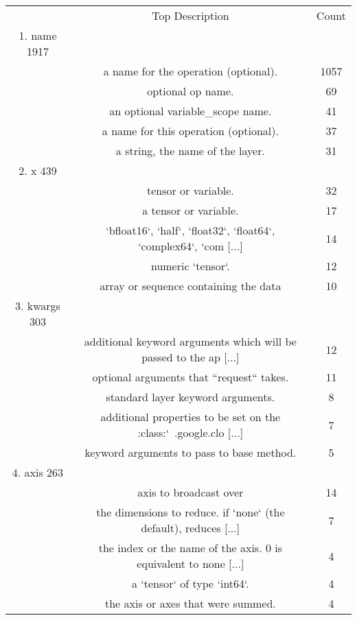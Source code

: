 \begin{table}[h]
    \begin{center}
    \begin{tabular}{c | c | c }       
 & Top Description & Count\\
1. name   1917 \\
\hline
&  a name for the operation (optional).                                & 1057 \\
&  optional op name.                                                   & 69 \\
&  an optional variable\_scope name.                                    & 41 \\
&  a name for this operation (optional).                               & 37 \\
&  a string, the name of the layer.                                    & 31 \\

2. x       439 \\
\hline
&  tensor or variable.                                                 & 32 \\
&  a tensor or variable.                                               & 17 \\
&  `bfloat16`, `half`, `float32`, `float64`, `complex64`, `com [...]   & 14 \\
&  numeric `tensor`.                                                   & 12 \\
&  array or sequence containing the data                               & 10 \\

3. kwargs  303 \\
\hline
&  additional keyword arguments which will be passed to the ap [...]   & 12 \\
&  optional arguments that ``request`` takes.                          & 11 \\
&  standard layer keyword arguments.                                   & 8 \\
&  additional properties to be set on the :class:`~.google.clo [...]   & 7 \\
&  keyword arguments to pass to base method.                           & 5 \\

4. axis    263 \\
\hline
&  axis to broadcast over                                              & 14 \\
&  the dimensions to reduce. if `none` (the default), reduces  [...]   & 7 \\
&  the index or the name of the axis. 0 is equivalent to none  [...]   & 4 \\
&  a `tensor` of type `int64`.                                         & 4 \\
&  the axis or axes that were summed.                                  & 4 \\


\end{tabular}
\end{center}
\end{table}
